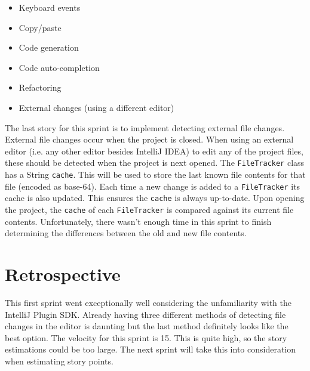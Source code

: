 \begin{itemize}
  \item Keyboard events
  \item Copy/paste
  \item Code generation
  \item Code auto-completion
  \item Refactoring
  \item External changes (using a different editor)
\end{itemize}

The last story for this sprint is to implement detecting external file changes. External file changes occur when the project is closed. When using an external editor (i.e. any other editor besides IntelliJ IDEA) to edit any of the project files, these should be detected when the project is next opened. The \texttt{FileTracker} class has a String \texttt{cache}. This will be used to store the last known file contents for that file (encoded as base-64). Each time a new change is added to a \texttt{FileTracker} its cache is also updated. This ensures the \texttt{cache} is always up-to-date. Upon opening the project, the \texttt{cache} of each \texttt{FileTracker} is compared against its current file contents. Unfortunately, there wasn't enough time in this sprint to finish determining the differences between the old and new file contents.

\section{Retrospective}
This first sprint went exceptionally well considering the unfamiliarity with the IntelliJ Plugin SDK. Already having three different methods of detecting file changes in the editor is daunting but the last method definitely looks like the best option. The velocity for this sprint is 15. This is quite high, so the story estimations could be too large. The next sprint will take this into consideration when estimating story points.
